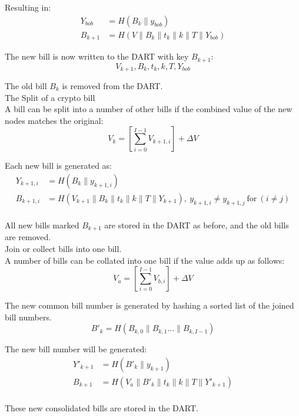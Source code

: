 Resulting in:
\begin{equation}
 \begin{align*}
 Y_{bob} & = H(B_k \parallel y_{bob} ) \\
 B_{k+1} & = H ( V \parallel B_k \parallel t_k \parallel k \parallel T \parallel Y_{bob} )
\end{align*}
\end{equation}


The new bill is now written to the DART with key $B_{k+1}$:
\begin{equation*}
 V_{k+1}, B_k, t_k, k, T, Y_{bob} 
\end{equation*}


The old bill $B_k$  is removed from the DART. \\ 

The Split of a crypto bill \\
A bill can be split into a number of other bills if the combined value of the new nodes matches the original:
 \begin{equation}
  V_k = \left [ \sum_{i=0}^{I-1} {V_{k+1,i}} \right ] + {\Delta}V
 \end{equation}

Each new bill is generated as:
\begin{equation}
 \begin{align*}
 Y_{k+1,i} & = H ( B_k \parallel y_{k+1,i} ) \\
 B_{k+1,i} & = H ( V_{k+1} \parallel B_k \parallel t_k \parallel k \parallel T \parallel Y_{k+1} ), 
 ~ y_{k+1,i} \ne y_{k+1,j} ~ \text{for} ~ (i \ne j) \\
\end{align*}
\end{equation}
 

All new bills marked $B_{k+1}$ are stored in the DART as before, and the old bills are removed. \\
Join or collect bills into one bill.\\
A number of bills can be collated into one bill if the value adds up as follows:
\begin{equation}
 V_a = \left[ \sum_{i=0}^{I-1} {V_{b,i}} \right] + {\Delta}V    
\end{equation}

The new common bill number is generated by hashing a sorted list of the joined bill numbers.  
\begin{equation}
 B'_k = H ( B_{k,0} \parallel B_{k,1} ... \parallel B_{k,I-1} )
\end{equation}

The new bill number will be generated: 
\begin{equation}
 \begin{align*}
  Y'_{k+1} & = H ( B'_k \parallel y_{k+1} ) \\
  B_{k+1} & = H ( V_a \parallel B'_k \parallel t_k \parallel k \parallel T \parallel Y'_{k+1} ) \\
 \end{align*}
\end{equation}

These new consolidated bills are stored in the DART.
